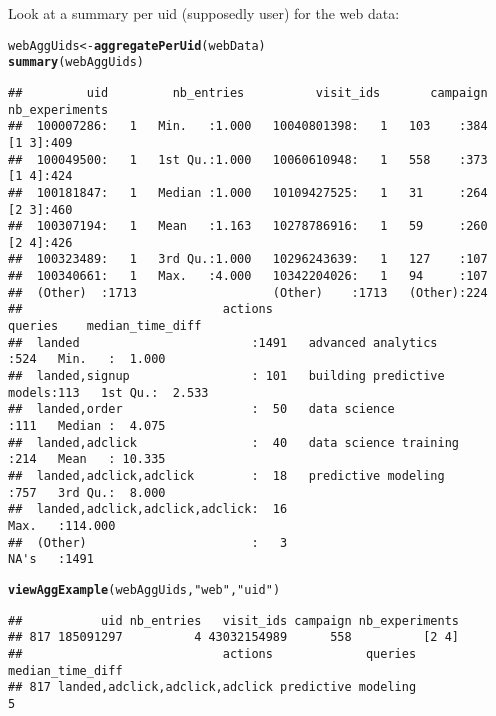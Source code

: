 \documentclass{article}\usepackage[]{graphicx}\usepackage[]{color}
\makeatletter
\newcommand{\hlstr}[1]{\textcolor[rgb]{0.192,0.494,0.8}{#1}}%
\newcommand{\hlstd}[1]{\textcolor[rgb]{0.345,0.345,0.345}{#1}}%
\newcommand{\hlkwb}[1]{\textcolor[rgb]{0.69,0.353,0.396}{#1}}%
\newcommand{\hlkwd}[1]{\textcolor[rgb]{0.737,0.353,0.396}{\textbf{#1}}}%
\newenvironment{kframe}{%
 \def\at@end@of@kframe{}%
 \ifinner\ifhmode%
  \def\at@end@of@kframe{\end{minipage}}%
  \begin{minipage}{\columnwidth}%
 \fi\fi%
 \def\FrameCommand##1{\hskip\@totalleftmargin \hskip-\fboxsep
 \colorbox{shadecolor}{##1}\hskip-\fboxsep
     \hskip-\linewidth \hskip-\@totalleftmargin \hskip\columnwidth}%
 \MakeFramed {\advance\hsize-\width
   \@totalleftmargin\z@ \linewidth\hsize
   \@setminipage}}%
 {\par\unskip\endMakeFramed%
 \at@end@of@kframe}
\newenvironment{knitrout}{}{} %
\makeatother
\begin{document}
Look at a summary per uid (supposedly user) for the web data:
\begin{knitrout}
\color{fgcolor}\begin{kframe}
\begin{alltt}
\hlstd{webAggUids} \hlkwb{<-} \hlkwd{aggregatePerUid}\hlstd{(webData)}
\hlkwd{summary}\hlstd{(webAggUids)}
\end{alltt}
\begin{verbatim}
##         uid         nb_entries          visit_ids       campaign   nb_experiments
##  100007286:   1   Min.   :1.000   10040801398:   1   103    :384   [1 3]:409     
##  100049500:   1   1st Qu.:1.000   10060610948:   1   558    :373   [1 4]:424     
##  100181847:   1   Median :1.000   10109427525:   1   31     :264   [2 3]:460     
##  100307194:   1   Mean   :1.163   10278786916:   1   59     :260   [2 4]:426     
##  100323489:   1   3rd Qu.:1.000   10296243639:   1   127    :107                 
##  100340661:   1   Max.   :4.000   10342204026:   1   94     :107                 
##  (Other)  :1713                   (Other)    :1713   (Other):224                 
##                            actions                           queries    median_time_diff 
##  landed                        :1491   advanced analytics        :524   Min.   :  1.000  
##  landed,signup                 : 101   building predictive models:113   1st Qu.:  2.533  
##  landed,order                  :  50   data science              :111   Median :  4.075  
##  landed,adclick                :  40   data science training     :214   Mean   : 10.335  
##  landed,adclick,adclick        :  18   predictive modeling       :757   3rd Qu.:  8.000  
##  landed,adclick,adclick,adclick:  16                                    Max.   :114.000  
##  (Other)                       :   3                                    NA's   :1491
\end{verbatim}
\begin{alltt}
\hlkwd{viewAggExample}\hlstd{(webAggUids,} \hlstr{"web"}\hlstd{,} \hlstr{"uid"}\hlstd{)}
\end{alltt}
\begin{verbatim}
##           uid nb_entries   visit_ids campaign nb_experiments
## 817 185091297          4 43032154989      558          [2 4]
##                            actions             queries median_time_diff
## 817 landed,adclick,adclick,adclick predictive modeling                5
\end{verbatim}
\end{kframe}
\end{knitrout}
\end{document}
